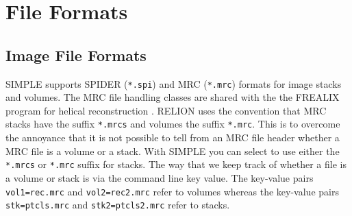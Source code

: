 \documentclass[a4paper,11pt]{article}
\begin{document}
\section{File Formats}

\subsection{Image File Formats}
SIMPLE supports SPIDER (\texttt{*.spi}) and MRC (\texttt{*.mrc}) formats for image stacks and volumes. The MRC file handling classes are shared with the the FREALIX program for helical reconstruction \citep{Rohou:2014aa}. RELION \citep{Scheres:2012aa} uses the convention that MRC stacks have the suffix \texttt{*.mrcs} and volumes the suffix \texttt{*.mrc}. This is to overcome the annoyance that it is not possible to tell from an MRC file header whether a MRC file is a volume or a stack. With SIMPLE you can select to use either the \texttt{*.mrcs} or \texttt{*.mrc} suffix for stacks. The way that we keep track of whether a file is a volume or stack is via the command line key value. The key-value pairs \texttt{vol1=rec.mrc} and \texttt{vol2=rec2.mrc} refer to volumes whereas the key-value pairs \texttt{stk=ptcls.mrc} and \texttt{stk2=ptcls2.mrc} refer to stacks.
\end{document}
